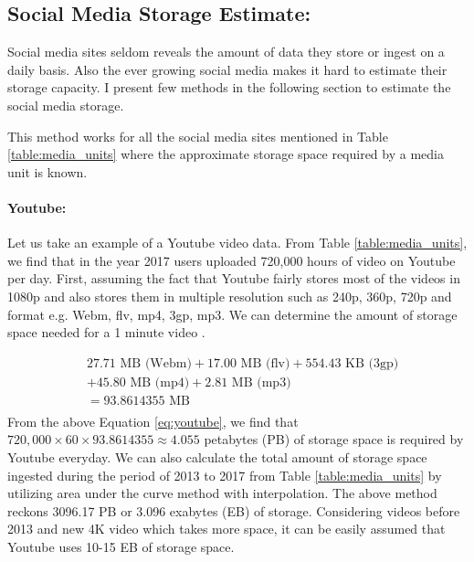 \subsection*{Social Media Storage Estimate:}
Social media sites seldom reveals the amount of data they store or ingest on a daily basis. Also the ever growing social media makes it hard to estimate their storage capacity. I present few methods in the following section to estimate the social media storage.

This method works for all the social media sites mentioned in Table \ref{table:media_units} where the approximate storage space required by a media unit is known.

\vspace{-2mm}
\paragraph{Youtube:}
Let us take an example of a Youtube video data. From Table  \ref{table:media_units}, we find that in the year 2017 users uploaded 720,000 hours of video on Youtube per day. First, assuming the fact that Youtube fairly stores most of the videos
 in 1080p and also stores them in multiple resolution such as 240p, 360p, 720p and format e.g. Webm, flv, mp4, 3gp, mp3. We can determine the amount of storage space needed for a 1 minute video \cite{youtube_stats}.

\vspace{-3mm}
\begin{equation}
\begin{split}
  &27.71 \text{ MB (Webm)} + 17.00 \text{ MB (flv)} + 554.43 \text{ KB (3gp)} \\
  &+ 45.80 \text{ MB (mp4)} + 2.81 \text{ MB (mp3)}\\
  &= 93.8614355 \text{ MB}\\
  \end{split}
  \label{eq:youtube}
\end{equation}
 From the above Equation \ref{eq:youtube}, we find that $720,000 \times 60 \times 93.8614355 \approx 4.055$ petabytes (PB)  of storage space is required by Youtube everyday. We can also calculate the total amount of storage space ingested during the period of 2013 to 2017 from Table \ref{table:media_units} by utilizing area under the curve method with interpolation. The above method reckons 3096.17 PB or 3.096 exabytes (EB) of storage. Considering videos before 2013 and new 4K video which takes more space, it can be easily assumed that Youtube uses 10-15 EB of storage space.


